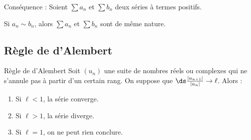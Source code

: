 Conséquence : Soient $\sum a_n$ et $\sum b_n$ deux séries à termes positifs.

Si $a_n \sim b_n$, alors $\sum a_n$ et $\sum b_n$ sont de même nature.

\subsection{Règle de d'Alembert }

\begin{theoreme}{Règle de d'Alembert}{}
    Soit $(u_n)$ une suite de nombres réels ou complexes qui ne s'annule pas 
    à partir d'un certain rang. On suppose que $\ds \frac{|u_{n + 1}|}{|u_n|} \to \ell$.
    Alors : 
    
    \begin{enumerate}
        \item Si $\ell < 1$, la série converge.
        \item Si $\ell > 1$, la série diverge.
        \item Si $\ell = 1$, on ne peut rien conclure.
    \end{enumerate}
\end{theoreme}



